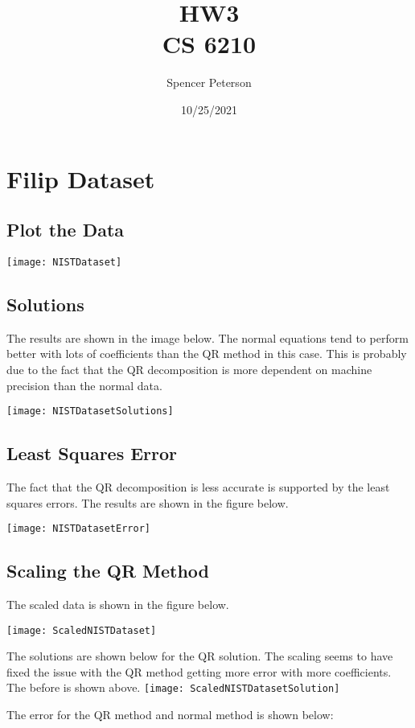 \documentclass{article}
\title{HW3 \\
	\large CS 6210}
\date{10/25/2021}
\author{Spencer Peterson}
\begin{document}
\maketitle


\section{Filip Dataset}

\subsection{Plot the Data}

\texttt{[image: NISTDataset]}

\subsection{Solutions}

The results are shown in the image below. The normal equations tend to perform better with lots of coefficients than the QR method in this case. This is probably due to the fact that the QR decomposition is more dependent on machine precision than the normal data.

\texttt{[image: NISTDatasetSolutions]}

\subsection{Least Squares Error}
The fact that the QR decomposition is less accurate is supported by the least squares errors. The results are shown in the figure below.

\texttt{[image: NISTDatasetError]}

\subsection{Scaling the QR Method}

The scaled data is shown in the figure below.

\texttt{[image: ScaledNISTDataset]}


The solutions are shown below for the QR solution. The scaling seems to have fixed the issue with the QR method getting more error with more coefficients. The before is shown above.
\texttt{[image: ScaledNISTDatasetSolution]}

The error for the QR method and normal method is shown below:
\end{document}
